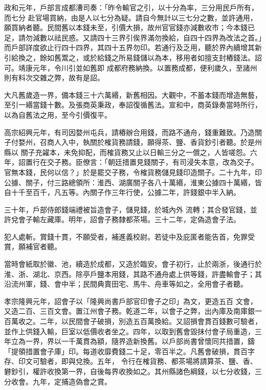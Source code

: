 \begin{pinyinscope}
 政和元年，戶部言成都漕司奏：「昨令輸官之引，以十分為率，三分用民戶所有，而七分
 赴官場買納，由是人以七分為疑。請自今無計以三七分之數，並許通用，願買納者聽。民間舊以本錢未至，引價大損，故州官官錢亦減數收市；今本錢已足，請勿減數以祛民惑。又請四十三界引俟界滿勿換給，自四十四界為改法之首。」而戶部詳度欲止行四十四界，其四十五界勿印。若通行及乏用，聽於界內續增其新引給換之，餘如舊鬻之，或於給錢之所易錢儲以為本，移用者如擅支封樁錢法。詔可。靖康元年，令川引並如舊即
 成都府務納換。以置務成都，便利歲久，至諸州則有料次交雜之弊，故有是詔。



 大凡舊歲造一界，備本錢三十六萬緡，新舊相因。大觀中，不蓄本錢而增造無藝，至引一緡當錢十數。及張商英秉政，奉詔復循舊法。宣和中，商英錄奏當時所行，以為自舊法之用，至今引價復平。



 高宗紹興元年，有司因婺州屯兵，請樁辦合用錢，而路不通舟，錢重難致。乃造關子付婺州，召商人入中，執關於榷貨務請錢，願得茶、鹽、香貨鈔引者聽。於是州縣以
 關子充糴本，未免抑配，而榷貨務又止以日輸三分之一償之，人皆嗟怨。六年，詔置行在交子務。臣僚言：「朝廷措置見錢關子，有司浸失本意，改為交子。官無本錢，民何以信？」於是罷交子務，令榷貨務儲見錢印造關子。二十九年，印公據、關子，付三路總領所：淮西、湖廣關子各八十萬緡，淮東公據四十萬緡，皆自十千至百千，凡五等。內關子作三年行使，公據二年，許錢銀中半入納。



 三十年，戶部侍郎錢端禮被旨造會子，儲見錢，於城內外
 流轉；其合發官錢，並許兌會子輸左藏庫。明年，詔會子務隸都茶場。三十二年，定偽造會子法。



 犯人處斬。賞錢十貫，不願受者，補進義校尉。若徒中及庇匿者能告首，免罪受賞，願補官者聽。



 當時會紙取於徽、池，續造於成都，又造於臨安。會子初行，止於兩浙，後通行於淮、浙、湖北、京西。除亭戶鹽本用錢，其路不通舟處上供等錢，許盡輸會子；其沿流州軍，錢、會中半；民間典賣田宅、馬牛、舟車等如之，全用會子者聽。



 孝宗隆興元年，詔會子以「隆興尚書戶部官印會子之印」為文，更造五百
 文會，又造二百、三百文會。置江州會子務。乾道二年，以會子之弊，出內庫及南庫銀一百萬收之。二年，以民間會子破損，別造五百萬換給。又詔損會貫百錢數可驗者，並作上供錢入輸，巨室以低價收者坐之。四年，以取到舊會毀抹付會子局重造，三年立為一界，界以一千萬貫為額，隨界造新換舊。以戶部尚書曾懷同共措置，鑄「提領措置會子庫」印。每道收靡費錢二十足，零百半之。凡舊會破損，貫百字存、印文可驗者，即與兌換。五年，
 令行在榷貨務、都茶場將請算茶、鹽、香、礬鈔引，權許收換第一界，自後每界收換如之。其州縣諸色綱錢，以七分收錢，三分收會。九年，定捕造偽會之賞。




\end{pinyinscope}
